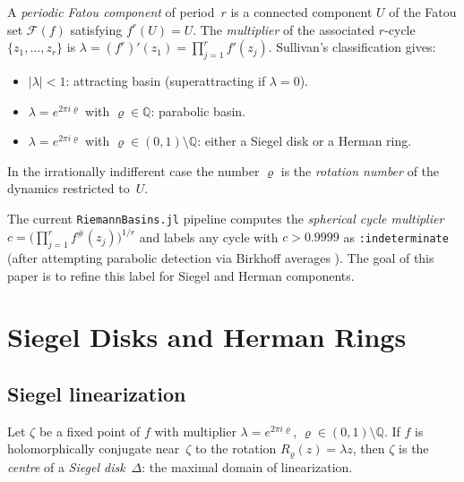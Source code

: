 \documentclass[12pt,a4paper]{article}
\newcommand{\fsh}{f^\#}       %
\newcommand{\rot}{\varrho}    %
\newcommand{\QQ}{\mathbb{Q}}
\begin{document}
A \emph{periodic Fatou component} of period~$r$ is a connected component
$U$ of the Fatou set $\mathcal{F}(f)$ satisfying $f^r(U) = U$.
The \emph{multiplier} of the associated $r$-cycle $\{z_1,\ldots,z_r\}$ is
$\lambda = (f^r)'(z_1) = \prod_{j=1}^r f'(z_j)$.
Sullivan's classification \cite{Sullivan1983} gives:
\begin{itemize}
  \item $|\lambda| < 1$: attracting basin (superattracting if $\lambda=0$).
  \item $\lambda = e^{2\pi i\rot}$ with $\rot\in\QQ$: parabolic basin.
  \item $\lambda = e^{2\pi i\rot}$ with $\rot\in(0,1)\setminus\QQ$:
        either a Siegel disk or a Herman ring.
\end{itemize}
In the irrationally indifferent case the number $\rot$ is the
\emph{rotation number} of the dynamics restricted to~$U$.

\medskip

The current \texttt{RiemannBasins.jl} pipeline computes the \emph{spherical
cycle multiplier}
$c = \bigl(\prod_{j=1}^r \fsh(z_j)\bigr)^{1/r}$
and labels any cycle with $c > 0.9999$ as \texttt{:indeterminate} (after
attempting parabolic detection via Birkhoff averages \cite{FatouHopf2026}).
The goal of this paper is to refine this label for Siegel and Herman
components.

\section{Siegel Disks and Herman Rings}
\label{sec:rotation}

\subsection{Siegel linearization}
\label{ssec:siegel}

Let $\zeta$ be a fixed point of $f$ with multiplier $\lambda = e^{2\pi i\rot}$,
$\rot\in(0,1)\setminus\QQ$.
If $f$ is holomorphically conjugate near~$\zeta$ to the rotation
$R_\rot(z) = \lambda z$, then $\zeta$ is the \emph{centre} of a
\emph{Siegel disk}~$\Delta$: the maximal domain of linearization.
\end{document}
